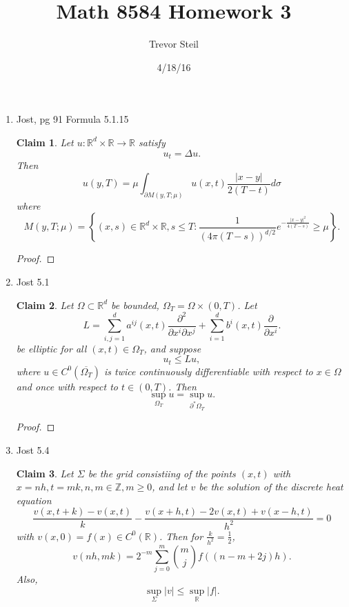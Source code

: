 \documentclass[a4paper]{article}
\title{Math 8584 Homework 3 }
\date{4/18/16}
\author{Trevor Steil}
\newtheorem*{claim}{Claim}
\newcommand{\R}{\mathbb{R}}
\newcommand{\Z}{\mathbb{Z}}
\begin{document}
\maketitle
\begin{enumerate}
  \item Jost, pg 91 Formula 5.1.15
    \begin{claim}
      Let $u: \R^d \times \R \to \R$ satisfy
      \begin{equation*}
        u_t = \Delta u.
      \end{equation*}
      Then
      \[ u(y,T) = \mu \int_{\partial M(y, T; \mu)}^{} u(x,t) \frac{|x-y|}{2(T-t)} d \sigma \]
      where
      \[ M(y,T; \mu) = \left\{ (x,s) \in \R^d \times \R, s \leq T : \frac{1}{(4 \pi (T-s))^{d/2}} e^{-\frac{|x-y|^2}{4(T-s)} } \geq \mu \right\} .\]
    \end{claim}

    \begin{proof}
    \end{proof}

  \item Jost 5.1
    \begin{claim}
      Let $\Omega \subset \R^d$ be bounded, $\Omega_T = \Omega \times (0,T)$. Let
      \[ L = \sum_{i,j=1}^d a^{ij}(x,t) \frac{\partial^2}{\partial x^i \partial x^j} + \sum_{i=1}^d b^i(x,t) \frac{\partial}{\partial x^i} .\]
      be elliptic for all $(x,t) \in \Omega_T$, and suppose
      \[ u_t \leq Lu, \]
      where $u \in C^0(\overline{\Omega_T})$ is twice continuously differentiable with respect to $x \in \Omega$ and once with respect to $t \in
      (0,T)$. Then
      \[ \sup_{\Omega_T} u = \sup_{\partial^\ast \Omega_T} u. \]
    \end{claim}

    \begin{proof}
    \end{proof}

  \item Jost 5.4
    \begin{claim}
      Let $\Sigma$ be the grid consistiing of the points $(x,t)$ with $x = nh, t = mk, n,m \in \Z, m \geq 0$, and let $v$ be the solution of the
      discrete heat equation
      \[ \frac{v(x,t+k) - v(x,t)}{k} - \frac{v(x+h,t) - 2v(x,t) + v(x-h,t)}{h^2} = 0 \]
      with $v(x,0) = f(x) \in C^0(\R)$.
      Then for $\frac{k}{h^2} = \frac{1}{2}$,
      \[ v(nh, mk) = 2^{-m} \sum_{j=0}^m \binom{m}{j} f \left( (n - m + 2j)h \right) .\]
      Also,
      \[ \sup_{\Sigma} |v| \leq \sup_\R |f|. \]
    \end{claim}


\end{enumerate}
\end{document}
